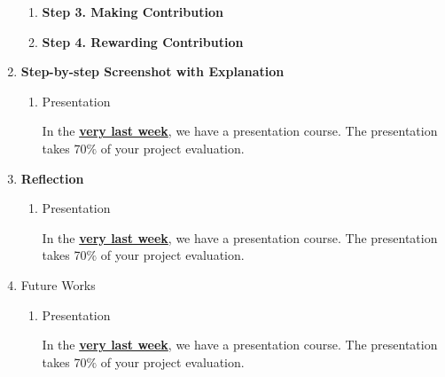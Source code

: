 \documentclass[12pt]{article}
\renewcommand{\_}{\kern-1.5pt\textunderscore\kern-1.5pt}
\begin{document}
\begin{enumerate}
\begin{enumerate}
		           
		     \item \textbf{Step 3. Making Contribution}\par
		     
		     \item \textbf{Step 4. Rewarding Contribution}\par
		     
		     
		            
	      \end{enumerate}
	      
	\item \textbf{Step-by-step Screenshot with Explanation}\par

	      \begin{enumerate}
		      \item Presentation\par

		            In the \textbf{\uline{very last week}}, we have a presentation course. The presentation takes 70$\%$  of your project evaluation. \par


		            \vspace{\baselineskip}

	      \end{enumerate}

	\item \textbf{Reflection}\par

	      \begin{enumerate}
		      \item Presentation\par

		            In the \textbf{\uline{very last week}}, we have a presentation course. The presentation takes 70$\%$  of your project evaluation. \par


		            \vspace{\baselineskip}

	      \end{enumerate}

	\item Future Works\par

	      \begin{enumerate}
		      \item Presentation\par

		            In the \textbf{\uline{very last week}}, we have a presentation course. The presentation takes 70$\%$  of your project evaluation. \par



\end{enumerate}
\end{enumerate}
\end{document}
